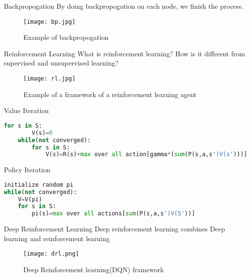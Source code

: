 \begin{frame}{Backpropogation}
    By doing backpropogation on each node, we finish the process. 
    \begin{figure}
        \centering
        \texttt{[image: bp.jpg]}\\
        \caption{Example of backpropogation }
        \label{fig:bp}
    \end{figure}
\end{frame}

\begin{frame}{Reinforcement Learning}
    What is reinforcement learning? How is it different from supervised and unsupervised learning?
    \begin{figure}
        \centering
        \texttt{[image: rl.jpg]}\\
        \caption{Example of a framework of a reinforcement learning agent }
        \label{fig:rl}
    \end{figure}
\end{frame}

\begin{frame}[fragile]{Value Iteration}
    \begin{lstlisting}[language=python, caption=value iteration algorithm]
    for s in S:
        V(s)=0
    while(not converged):
        for s in S:
            V(s)=R(s)+max over all action[gamma*(sum(P(s,a,s')V(s')))]
    \end{lstlisting}
\end{frame}

\begin{frame}[fragile]{Policy Iteration}
\begin{lstlisting}[language=python, caption=Policy iteration algorithm]
initialize random pi
while(not converged):
    V=V(pi)
    for s in S:
        pi(s)=max over all actions[sum(P(s,a,s')V(S'))]
\end{lstlisting}
\end{frame}

\begin{frame}{Deep Reinforcement Learning}
    Deep reinforcement learning combines Deep learning and reinforcement learning
    \begin{figure}
        \centering
        \texttt{[image: drl.png]}\\
        \caption{Deep Reinforcement learning(DQN) framework}
        \label{fig:drl}
    \end{figure}
\end{frame}
